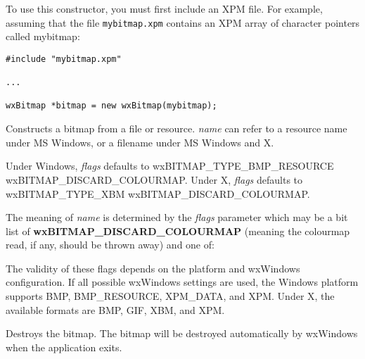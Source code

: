 To use this constructor, you must first include an XPM file. For
example, assuming that the file {\tt mybitmap.xpm} contains an XPM array
of character pointers called mybitmap:

\begin{verbatim}
#include "mybitmap.xpm"

...

wxBitmap *bitmap = new wxBitmap(mybitmap);
\end{verbatim}


Constructs a bitmap from a file or resource. {\it name} can refer
to a resource name under MS Windows, or a filename under MS Windows and X.

Under Windows, {\it flags} defaults to wxBITMAP\_TYPE\_BMP\_RESOURCE \pipe wxBITMAP\_DISCARD\_COLOURMAP.
Under X, {\it flags} defaults to wxBITMAP\_TYPE\_XBM \pipe wxBITMAP\_DISCARD\_COLOURMAP.

The meaning of {\it name} is determined by the {\it flags} parameter which
may be a bit list of {\bf wxBITMAP\_DISCARD\_COLOURMAP} (meaning the colourmap read,
if any, should be thrown away) and one of:

\begin{twocollist}\itemsep=0pt
\end{twocollist}

The validity of these flags depends on the platform and wxWindows configuration.
If all possible wxWindows settings are used, the Windows platform supports BMP, BMP\_RESOURCE,
XPM\_DATA, and XPM. Under X, the available formats are BMP, GIF, XBM, and XPM.



Destroys the bitmap. The bitmap will be destroyed automatically by wxWindows
when the application exits.


